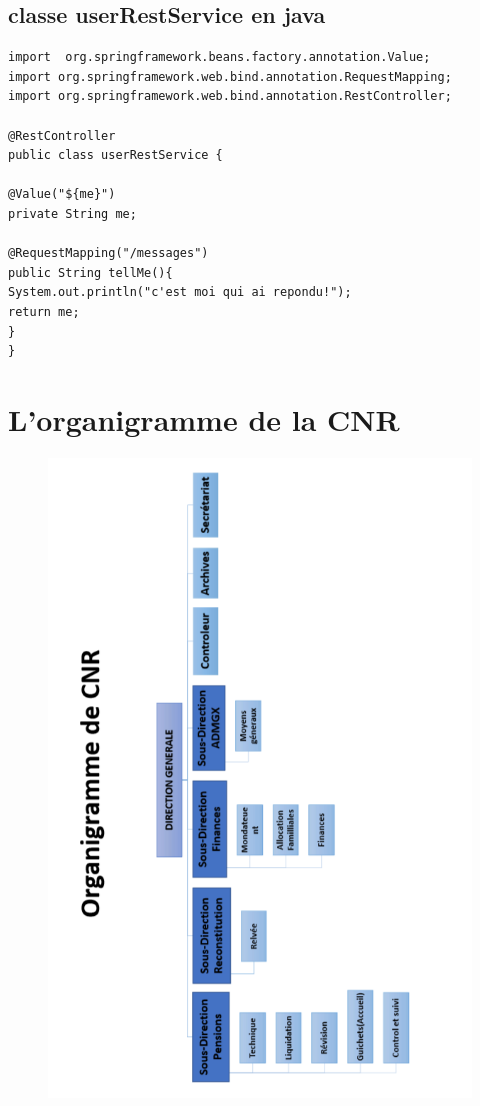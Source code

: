        \section{classe userRestService en java }
      \begin{lstlisting}
import  org.springframework.beans.factory.annotation.Value;
import org.springframework.web.bind.annotation.RequestMapping;
import org.springframework.web.bind.annotation.RestController;

@RestController
public class userRestService {

@Value("${me}")
private String me;

@RequestMapping("/messages")
public String tellMe(){
System.out.println("c'est moi qui ai repondu!");
return me;
}
}
      \end{lstlisting}  
        
        \chapter{L'organigramme de la CNR}
       
        
 
        
      
\begin{figure}[H]
	\centering
	\includegraphics[width=1\linewidth,height=0.58\paperheight]{images/orgpdf}
	\caption{}
	\label{fig:orgpdf}
\end{figure}
